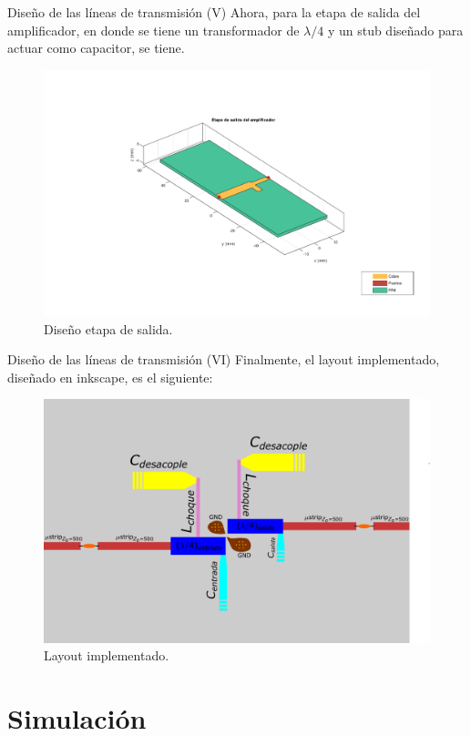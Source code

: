 \documentclass[9pt]{beamer}
\begin{document}
	\begin{frame}{Diseño de las líneas de transmisión (V)}
		Ahora, para la etapa de salida del amplificador, en donde se tiene un transformador de $\lambda /4$ y un stub diseñado para actuar como capacitor, se tiene.
		
		\begin{figure}
			\centering
			\includegraphics[width=0.8\linewidth]{../salida}
			\caption{Diseño etapa de salida.}
			\label{fig:salida}
		\end{figure}
		
	\end{frame}
	
	\begin{frame}{Diseño de las líneas de transmisión (VI)}
		Finalmente, el layout implementado, diseñado en inkscape, es el siguiente:
		\begin{figure}
			\centering
			\includegraphics[width=0.8\linewidth]{img/layout}
			\caption{Layout implementado.}
			\label{fig:layout}
		\end{figure}
		
	\end{frame}
	
	\section{Simulación}
	
\end{document}
